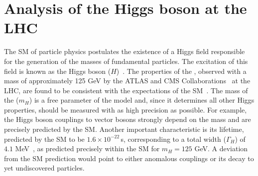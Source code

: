 \chapter{Analysis of the Higgs boson at the LHC} \label{chap:chap-4}








The SM of particle physics postulates the existence of a Higgs field responsible for the
generation of the masses of fundamental particles. The excitation of this
field is known as the Higgs boson ($H$)~\cite{StandardModel67_1, Englert:1964et,Higgs:1964ia,
Higgs:1964pj,Guralnik:1964eu,StandardModel67_2,StandardModel67_3}.
The properties of the \Hboson, observed with a mass of approximately 125 GeV by the ATLAS and CMS
Collaborations~\cite{Aad:2012tfa,Chatrchyan:2012xdj,Chatrchyan:2013lba} at the LHC, are found to be consistent with
the expectations of the SM~\cite{ATLASnature,CMSnature}. The mass of the \Hboson ($m_{H}$) is a free parameter of the model and, since it determines all other Higgs properties, should be measured with as high precision as possible.
For example, the Higgs boson couplings to vector bosons strongly depend on the \Hboson mass and are precisely predicted by the SM.
Another important \Hboson characteristic is its lifetime, predicted by the SM to be $1.6\times10^{-22}$\,s, corresponding to a total width ($\Gamma_H$) of $4.1$ MeV~\cite{deFlorian:2016spz},
as predicted precisely within the SM for $m_{H} = 125$ GeV.
A deviation from the SM prediction would point to either anomalous \Hboson couplings or its decay to yet undiscovered particles.

